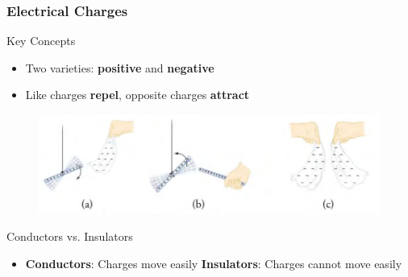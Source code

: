 \documentclass{beamer}
\begin{document}
\begin{frame}
    \frametitle{Electrical Charges}
    \begin{block}{Key Concepts}
        \begin{itemize}
                    \item Two varieties: \textbf{positive} and \textbf{negative}
            \item Like charges \textbf{repel}, opposite charges \textbf{attract}
        \end{itemize}
    \end{block}
    
    
        \begin{figure}
            \centering
            \includegraphics[width=1\linewidth]{phys11-electrostatics-charge-attraction-repulsion.png}
        \end{figure}
    
    
    \begin{block}{Conductors vs. Insulators}
        \begin{itemize}
            \item \textbf{Conductors}: Charges move easily \textbf{Insulators}: Charges cannot move easily
        \end{itemize}
    \end{block}
\end{frame}
\end{document}
